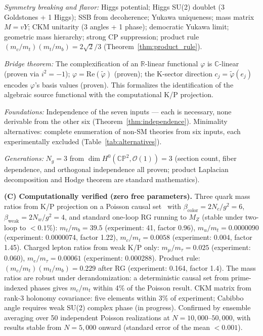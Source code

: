 \documentclass[12pt,a4paper]{article}
\begin{document}
\emph{Symmetry breaking and flavor:} Higgs potential; Higgs SU(2) doublet (3 Goldstones + 1 Higgs); SSB from decoherence; Yukawa uniqueness; mass matrix $M = vY$; CKM unitarity (3 angles + 1 phase); democratic Yukawa limit; geometric mass hierarchy; strong CP suppression; product rule $(m_c/m_t)(m_t/m_b) = 2\sqrt{2}/3$ (Theorem~\ref{thm:product_rule}).

\emph{Bridge theorem:} The complexification of an $\mathbb{R}$-linear functional $\varphi$ is $\mathbb{C}$-linear (proven via $i^2 = -1$); $\varphi = \mathrm{Re}(\tilde\varphi)$ (proven); the K-sector direction $c_j = \tilde\varphi(e_j)$ encodes $\varphi$'s basis values (proven).  This formalizes the identification of the algebraic source functional with the computational K/P projection.

\emph{Foundations:} Independence of the seven inputs --- each is necessary, none derivable from the other six (Theorem~\ref{thm:independence}).  Minimality alternatives: complete enumeration of non-SM theories from six inputs, each experimentally excluded (Table~\ref{tab:alternatives}).

\emph{Generations:} $N_g = 3$ from $\dim H^0(\mathbb{CP}^2, \mathcal{O}(1)) = 3$ (section count, fiber dependence, and orthogonal independence all proven; product Laplacian decomposition and Hodge theorem are standard mathematics).

\textbf{(C) Computationally verified (zero free parameters).} Three quark mass ratios from K/P projection on a Poisson causal set~\cite{difiore_causal} with $\beta_{\mathrm{color}} = 2N_c/g^2 = 6$, $\beta_{\mathrm{weak}} = 2N_w/g^2 = 4$, and standard one-loop RG running to $M_Z$ (stable under two-loop to $< 0.1\%$): $m_t/m_b = 39.5$ (experiment: 41, factor 0.96), $m_u/m_t = 0.0000090$ (experiment: 0.0000074, factor 1.22), $m_c/m_t = 0.0058$ (experiment: 0.004, factor 1.45). Charged lepton ratios from weak K/P only: $m_\mu/m_\tau = 0.025$ (experiment: 0.060), $m_e/m_\tau = 0.00061$ (experiment: 0.000288).  Product rule: $(m_c/m_t)(m_t/m_b) = 0.229$ after RG (experiment: 0.164, factor 1.4). The mass ratios are robust under derandomization: a deterministic causal set from prime-indexed phases gives $m_c/m_t$ within 4\% of the Poisson result. CKM matrix from rank-3 holonomy covariance: five elements within 3\% of experiment; Cabibbo angle requires weak SU(2) complex phase (in progress). Confirmed by ensemble averaging over 50 independent Poisson realizations at $N = 10{,}000$--$50{,}000$, with results stable from $N = 5{,}000$ onward (standard error of the mean $< 0.001$).
\end{document}

